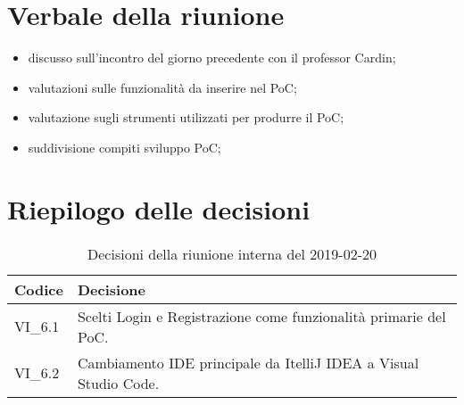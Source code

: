 \section{Verbale della riunione}
\begin{itemize}
	\item discusso sull'incontro del giorno precedente con il professor Cardin;
	\item valutazioni sulle funzionalità da inserire nel PoC;
	\item valutazione sugli strumenti utilizzati per produrre il PoC;
	\item suddivisione compiti sviluppo PoC;
\end{itemize}

\hspace{3cm}

\section{Riepilogo delle decisioni}

	
	\begin{longtable}{ >{\centering}p{} >{}p{}}
		\caption{Decisioni della riunione interna del 2019-02-20}\\	
		\rowcolorhead
		\textbf{\color{white}Codice} 
		& \centering\textbf{\color{white}Decisione} 
		\tabularnewline 
		\endfirsthead
		VI\_6.1 & Scelti Login e Registrazione come funzionalità primarie del 
		PoC.
		
		\tabularnewline 
		VI\_6.2 & Cambiamento IDE principale da ItelliJ IDEA a Visual Studio 
		Code.
		
		
		
		
	\end{longtable}
	




